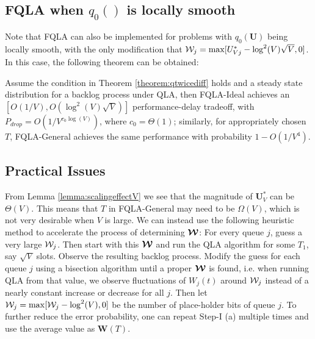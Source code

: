 \documentclass[journal]{IEEEtran}
\newcommand{\bv}[1]{{\boldsymbol{#1} }}
\newcommand{\script}[1]{{{\cal{#1} }}}
\begin{document}
 


\subsection{FQLA when $q_0()$ is locally smooth}\label{section:fqla_smooth}
Note that FQLA can also be implemented for problems with  $q_0(\bv{U})$ being locally smooth, with the only modification that $\script{W}_j=\max[U^*_{Vj}-\log^2(V)\sqrt{V},0]$. In this case, the following theorem can be obtained:
\begin{thm}
Assume the condition in Theorem \ref{theorem:qtwicediff} holds and a steady state distribution for a backlog process under QLA, then FQLA-Ideal achieves an $[O(1/V), O(\log^2(V)\sqrt{V})]$ performance-delay tradeoff, with $P_{drop}=O(1/V^{c_0\log(V)})$, where $c_0=\Theta(1)$; similarly, for appropriately chosen $T$, FQLA-General achieves the same performance with probability $1-O(1/V^4)$.
\end{thm}

\vspace{-.1in}
\subsection{Practical Issues}\label{section:fqla_practical}
From Lemma \ref{lemma:scalingeffectV} we see that the magnitude of $\bv{U}^*_V$ can be $\Theta(V)$. This means that $T$ in FQLA-General may need to be $\Omega(V)$, which is not very desirable when $V$ is large. We can instead use the following heuristic method to accelerate the process of determining $\bv{\script{W}}$: For every queue $j$, guess a very large $\script{W}_j$. Then start with this $\bv{\script{W}}$ and run the QLA algorithm for some $T_1$, say $\sqrt{V}$ slots. Observe the resulting backlog process. Modify the guess for each queue $j$ using a bisection algorithm until a proper $\bv{\script{W}}$ is found, i.e. when running QLA from that value, we observe fluctuations of $W_j(t)$ around $\script{W}_j$ instead of a nearly constant increase or decrease for all $j$. Then let $\script{W}_j=\max[\script{W}_j-\log^2(V),0]$ be the number of place-holder bits of queue $j$. To further reduce the error probability, one can repeat Step-I (a) multiple times and use the average value as $\bv{W}(T)$.
\end{document}
